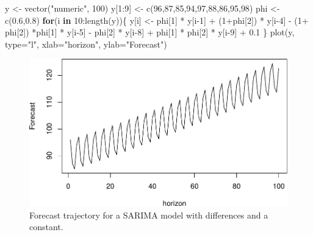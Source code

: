 \documentclass[
]{book}
\newenvironment{Shaded}{\begin{snugshade}}{\end{snugshade}}
\newcommand{\AttributeTok}[1]{\textcolor[rgb]{0.77,0.63,0.00}{#1}}
\newcommand{\ControlFlowTok}[1]{\textcolor[rgb]{0.13,0.29,0.53}{\textbf{#1}}}
\newcommand{\DecValTok}[1]{\textcolor[rgb]{0.00,0.00,0.81}{#1}}
\newcommand{\FloatTok}[1]{\textcolor[rgb]{0.00,0.00,0.81}{#1}}
\newcommand{\FunctionTok}[1]{\textcolor[rgb]{0.00,0.00,0.00}{#1}}
\newcommand{\NormalTok}[1]{#1}
\newcommand{\OtherTok}[1]{\textcolor[rgb]{0.56,0.35,0.01}{#1}}
\newcommand{\SpecialCharTok}[1]{\textcolor[rgb]{0.00,0.00,0.00}{#1}}
\newcommand{\StringTok}[1]{\textcolor[rgb]{0.31,0.60,0.02}{#1}}
\theoremstyle{definition}
\theoremstyle{definition}
\theoremstyle{definition}
\theoremstyle{definition}
\theoremstyle{remark}
\begin{document}
\begin{Shaded}
\begin{Highlighting}[]
\NormalTok{y }\OtherTok{\textless{}{-}} \FunctionTok{vector}\NormalTok{(}\StringTok{"numeric"}\NormalTok{, }\DecValTok{100}\NormalTok{)}
\NormalTok{y[}\DecValTok{1}\SpecialCharTok{:}\DecValTok{9}\NormalTok{] }\OtherTok{\textless{}{-}} \FunctionTok{c}\NormalTok{(}\DecValTok{96}\NormalTok{,}\DecValTok{87}\NormalTok{,}\DecValTok{85}\NormalTok{,}\DecValTok{94}\NormalTok{,}\DecValTok{97}\NormalTok{,}\DecValTok{88}\NormalTok{,}\DecValTok{86}\NormalTok{,}\DecValTok{95}\NormalTok{,}\DecValTok{98}\NormalTok{)}
\NormalTok{phi }\OtherTok{\textless{}{-}} \FunctionTok{c}\NormalTok{(}\FloatTok{0.6}\NormalTok{,}\FloatTok{0.8}\NormalTok{)}
\ControlFlowTok{for}\NormalTok{(i }\ControlFlowTok{in} \DecValTok{10}\SpecialCharTok{:}\FunctionTok{length}\NormalTok{(y))\{}
\NormalTok{    y[i] }\OtherTok{\textless{}{-}}\NormalTok{ phi[}\DecValTok{1}\NormalTok{] }\SpecialCharTok{*}\NormalTok{ y[i}\DecValTok{{-}1}\NormalTok{] }\SpecialCharTok{+}\NormalTok{ (}\DecValTok{1}\SpecialCharTok{+}\NormalTok{phi[}\DecValTok{2}\NormalTok{]) }\SpecialCharTok{*}\NormalTok{ y[i}\DecValTok{{-}4}\NormalTok{] }\SpecialCharTok{{-}}
\NormalTok{      (}\DecValTok{1}\SpecialCharTok{+}\NormalTok{ phi[}\DecValTok{2}\NormalTok{]) }\SpecialCharTok{*}\NormalTok{phi[}\DecValTok{1}\NormalTok{] }\SpecialCharTok{*}\NormalTok{ y[i}\DecValTok{{-}5}\NormalTok{] }\SpecialCharTok{{-}}\NormalTok{ phi[}\DecValTok{2}\NormalTok{] }\SpecialCharTok{*}\NormalTok{ y[i}\DecValTok{{-}8}\NormalTok{] }\SpecialCharTok{+}
\NormalTok{      phi[}\DecValTok{1}\NormalTok{] }\SpecialCharTok{*}\NormalTok{ phi[}\DecValTok{2}\NormalTok{] }\SpecialCharTok{*}\NormalTok{ y[i}\DecValTok{{-}9}\NormalTok{] }\SpecialCharTok{+} \FloatTok{0.1}
\NormalTok{\}}
\FunctionTok{plot}\NormalTok{(y, }\AttributeTok{type=}\StringTok{"l"}\NormalTok{, }\AttributeTok{xlab=}\StringTok{"horizon"}\NormalTok{, }\AttributeTok{ylab=}\StringTok{"Forecast"}\NormalTok{)}
\end{Highlighting}
\end{Shaded}

\begin{figure}
\centering
\includegraphics{Svetunkov--2022----ADAM_files/figure-latex/SARIMADiffConstantTrajectory-1.pdf}
\caption{\label{fig:SARIMADiffConstantTrajectory}Forecast trajectory for a SARIMA model with differences and a constant.}
\end{figure}
\end{document}
